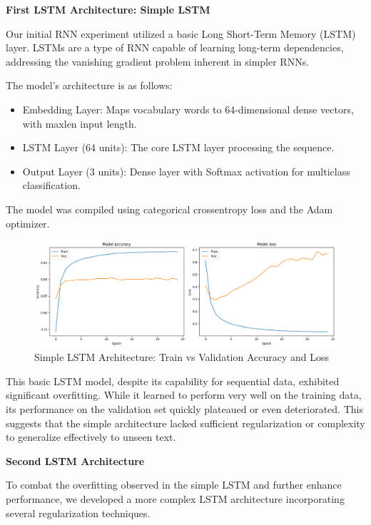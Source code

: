 \textbf{First LSTM Architecture: Simple LSTM}

Our initial RNN experiment utilized a basic Long Short-Term Memory (LSTM) layer. LSTMs are a type of RNN capable of learning long-term dependencies, addressing the vanishing gradient problem inherent in simpler RNNs.

The model's architecture is as follows:

\begin{itemize}
    \item Embedding Layer: Maps vocabulary words to 64-dimensional dense vectors, with maxlen input length.
    \item LSTM Layer (64 units): The core LSTM layer processing the sequence.
    \item Output Layer (3 units): Dense layer with Softmax activation for multiclass classification.
\end{itemize}

The model was compiled using categorical crossentropy loss and the Adam optimizer.

\begin{figure}[h!]
    \centering
    \includegraphics[width=1\linewidth]{images/lstm1.png}
    \caption{Simple LSTM Architecture: Train vs Validation Accuracy and Loss}
    \label{fig:enter-label}
\end{figure}

This basic LSTM model, despite its capability for sequential data, exhibited significant overfitting. While it learned to perform very well on the training data, its performance on the validation set quickly plateaued or even deteriorated. This suggests that the simple architecture lacked sufficient regularization or complexity to generalize effectively to unseen text.

\textbf{Second LSTM Architecture}

To combat the overfitting observed in the simple LSTM and further enhance performance, we developed a more complex LSTM architecture incorporating several regularization techniques.

